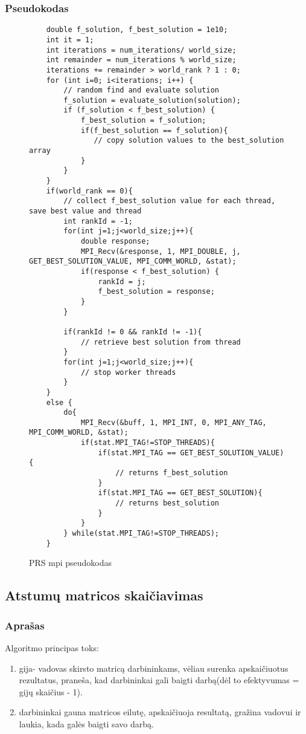 \documentclass[a4paper,10pt]{article}
\begin{document}
\subsubsection{Pseudokodas}
\begin{figure}[hbt!]
	\begin{verbatim}
    double f_solution, f_best_solution = 1e10;
    int it = 1;
    int iterations = num_iterations/ world_size;
    int remainder = num_iterations % world_size;
    iterations += remainder > world_rank ? 1 : 0;
    for (int i=0; i<iterations; i++) {
        // random find and evaluate solution
        f_solution = evaluate_solution(solution);
        if (f_solution < f_best_solution) { 
            f_best_solution = f_solution;
            if(f_best_solution == f_solution){
               // copy solution values to the best_solution array
            }
        }
    }
    if(world_rank == 0){
        // collect f_best_solution value for each thread, save best value and thread
        int rankId = -1;
        for(int j=1;j<world_size;j++){
            double response;
            MPI_Recv(&response, 1, MPI_DOUBLE, j, GET_BEST_SOLUTION_VALUE, MPI_COMM_WORLD, &stat);
            if(response < f_best_solution) {
                rankId = j;
                f_best_solution = response;
            }
        }

        if(rankId != 0 && rankId != -1){
            // retrieve best solution from thread
        }
        for(int j=1;j<world_size;j++){
            // stop worker threads
        }
    }
    else {
        do{
            MPI_Recv(&buff, 1, MPI_INT, 0, MPI_ANY_TAG, MPI_COMM_WORLD, &stat);
            if(stat.MPI_TAG!=STOP_THREADS){
                if(stat.MPI_TAG == GET_BEST_SOLUTION_VALUE) {
                    // returns f_best_solution
                }
                if(stat.MPI_TAG == GET_BEST_SOLUTION){
                    // returns best_solution
                }
            }
        } while(stat.MPI_TAG!=STOP_THREADS);
    }
\end{verbatim}
	\caption{PRS mpi pseudokodas}
	\label {PRS2}
\end{figure}

\newpage
\subsection{Atstumų matricos skaičiavimas}
\subsubsection{Aprašas}
Algoritmo principas toks:
\begin{enumerate}
\item gija- vadovas skirsto matricą darbininkams, vėliau surenka apskaičiuotus rezultatus, praneša, kad darbininkai gali baigti darbą(dėl to efektyvumas = gijų skaičius - 1). 
\item darbininkai gauna matricos eilutę, apskaičiuoja resultatą, gražina vadovui ir laukia, kada galės baigti savo darbą.
\end{enumerate}
\end{document}
